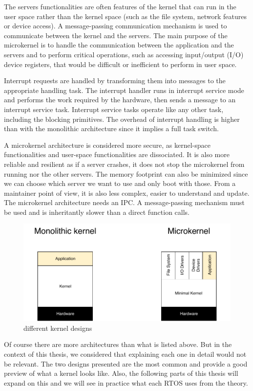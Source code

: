 The servers functionalities are often features of the kernel that can run in the user space
    rather than the kernel space (such as the file system, network features or device access)\cite{musaddiq2018survey}.
A message-passing communication mechanism is used to communicate between the kernel and the servers.
The main purpose of the microkernel is to handle the communication between the application and the servers
    and to perform critical operations, such as accessing input/output (I/O) device registers, that would be difficult or inefficient to perform in user space.

Interrupt requests are handled by transforming them into messages to the appropriate handling task.
The interrupt handler runs in interrupt service mode and performs the work required by the hardware, then sends a message to an interrupt service task.
Interrupt service tasks operate like any other task, including the blocking primitives.
The overhead of interrupt handling is higher than with the monolithic architecture since it implies a full task switch.

A microkernel architecture is considered more secure, as kernel-space functionalities and user-space functionalities are dissociated.
It is also more reliable and resilient as if a server crashes, it does not stop the microkernel from running nor the other servers.
The memory footprint can also be minimized since we can choose which server we want to use and only boot with those.
From a maintainer point of view, it is also less complex, easier to understand and update\cite{OS_for_iot}\cite{comparison_iot_constrained_devices}.
The microkernel architecture needs an IPC.
A message-passing mechanism must be used and is inheritantly slower than a direct function calls.
\\
\begin{figure}[!ht]
    \centering
    \includegraphics[scale=0.8]{assets/kernel_types.pdf}
    \caption{\label{fig:kernel-types}different kernel designs}
\end{figure}

Of course there are more architectures than what is listed above.
But in the context of this thesis, we considered that explaining each one in detail would not be relevant.
The two designs presented are the most common and provide a good preview of what a kernel looks like.
Also, the following parts of this thesis will expand on this
    and we will see in practice what each RTOS uses from the theory.

